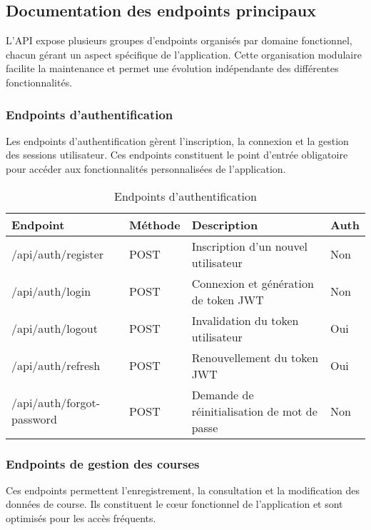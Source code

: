 \subsection{Documentation des endpoints principaux}

L'API expose plusieurs groupes d'endpoints organisés par domaine fonctionnel, chacun gérant un aspect spécifique de l'application. Cette organisation modulaire facilite la maintenance et permet une évolution indépendante des différentes fonctionnalités.

\subsubsection{Endpoints d'authentification}

Les endpoints d'authentification gèrent l'inscription, la connexion et la gestion des sessions utilisateur. Ces endpoints constituent le point d'entrée obligatoire pour accéder aux fonctionnalités personnalisées de l'application.

\begin{table}[h]
\centering
\small
\begin{tabularx}{\textwidth}{|l|l|X|l|}
\hline
\textbf{Endpoint} & \textbf{Méthode} & \textbf{Description} & \textbf{Auth} \\
\hline
/api/auth/register & POST & Inscription d'un nouvel utilisateur & Non \\
\hline
/api/auth/login & POST & Connexion et génération de token JWT & Non \\
\hline
/api/auth/logout & POST & Invalidation du token utilisateur & Oui \\
\hline
/api/auth/refresh & POST & Renouvellement du token JWT & Oui \\
\hline
/api/auth/forgot-password & POST & Demande de réinitialisation de mot de passe & Non \\
\hline
\end{tabularx}
\caption{Endpoints d'authentification}
\end{table}

\subsubsection{Endpoints de gestion des courses}

Ces endpoints permettent l'enregistrement, la consultation et la modification des données de course. Ils constituent le cœur fonctionnel de l'application et sont optimisés pour les accès fréquents.

